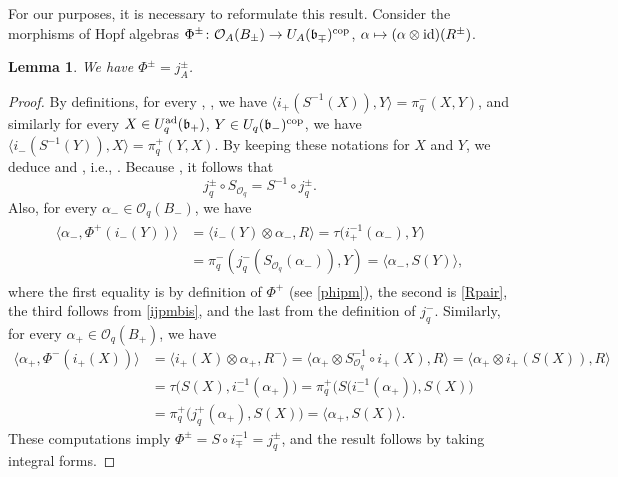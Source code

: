 \documentclass[pdftex]{sigma}
\numberwithin{equation}{section}
\newtheorem{lem}[teo]{Lemma}
\theoremstyle{definition}
\newcommand{\Oq}{\Oo_{q}}
\newcommand{\Oo}{{\mathcal O}}
\newcommand{\ra}{\rightarrow}
\begin{document}
For our purposes, it is necessary to reformulate this result. Consider the morphisms of Hopf algebras $\Phi^\pm\colon \Oo_A(B_\pm) \ra U_A(\mathfrak{b}_\mp)^{\rm cop}$, $\alpha\mapsto (\alpha \otimes {\rm id})(R^\pm)$.
\begin{lem}\label{Phij} We have $\Phi^\pm = j_A^\pm$.
\end{lem}
\begin{proof} By definitions, for every , , we have $\langle i_+(S^{-1}(X)), Y\rangle = \pi_q^-(X,Y)$, and similarly for every $X\in U_q^{\rm ad}(\mathfrak{b}_+)$, $Y\in U_q(\mathfrak{b}_-)^{\rm cop}$, we have $\langle i_-(S^{-1}(Y)), X\rangle = \pi_q^+(Y,X)$. By keeping these notations for $X$ and $Y$, we deduce  and , i.e., .
Because \smash{$S_{\Oq}^{-1} \circ i_\pm = i_\pm \circ S$}, it follows that
\begin{equation}\label{ijpmbis}
j_q^\pm\circ S_{\Oq} = S^{-1}\circ j_q^\pm .
\end{equation}
Also, for every $\alpha_-\in \Oo_q(B_-)$, we have
\begin{gather*}
\begin{split}
\big\langle \alpha_-, \Phi^+(i_-(Y))\big\rangle &= \langle i_-(Y) \otimes \alpha_-,R\rangle = \tau\big( i_+^{-1}(\alpha_-), Y\big)\\
& =
 \pi^-_q(j_q^-(S_{\Oq}(\alpha_-)),Y) = \langle \alpha_-,S(Y)\rangle,
\end{split}
\end{gather*}
where the first equality is by definition of $\Phi^+$ (see \eqref{phipm}), the second is \eqref{Rpair}, the third follows from \eqref{ijpmbis}, and the last from the definition of $j_q^-$. Similarly, for every $\alpha_+\in \Oo_q(B_+)$, we have
\begin{align*}
\langle \alpha_+, \Phi^-(i_+(X))\rangle & = \langle i_+(X) \otimes \alpha_+,R^-\rangle = \big\langle \alpha_+ \otimes S_{\Oq}^{-1}\circ i_+(X) , R\big\rangle = \langle \alpha_+ \otimes i_+(S(X)), R\rangle \\
& = \tau\big( S(X), i_-^{-1}(\alpha_+)\big) = \pi^+_q\big(S\big(i_-^{-1}(\alpha_+)\big), S(X)\big)\\
&= \pi^+_q\big(j_q^+(\alpha_+), S(X)\big) = \langle \alpha_+,S(X)\rangle.
\end{align*}
These computations imply $\Phi^\pm = S\circ i_\mp^{-1} = j_q^\pm$, and the result follows by taking integral forms.
\end{proof}
\end{document}
